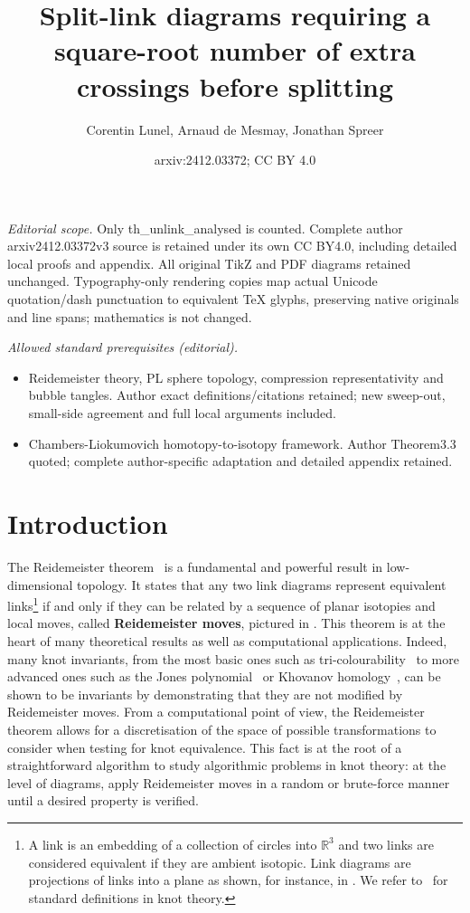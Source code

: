\documentclass[10pt,a4paper]{amsart}
\title{Split-link diagrams requiring a square-root number of extra crossings before splitting}
\author{Corentin Lunel, Arnaud de Mesmay, Jonathan Spreer}
\date{arxiv:2412.03372; CC BY 4.0}
\newcommand{\R}{\mathbb{R}}
\begin{document}
\maketitle
\noindent\textit{Editorial scope.} Only th\_unlink\_analysed is counted. Complete author arxiv2412.03372v3 source is retained under its own CC BY4.0, including detailed local proofs and appendix. All original TikZ and PDF diagrams retained unchanged. Typography-only rendering copies map actual Unicode quotation/dash punctuation to equivalent TeX glyphs, preserving native originals and line spans; mathematics is not changed.\par\medskip
\noindent\textit{Allowed standard prerequisites (editorial).}\begin{itemize}
\item Reidemeister theory, PL sphere topology, compression representativity and bubble tangles. Author exact definitions/citations retained; new sweep-out, small-side agreement and full local arguments included.
\item Chambers-Liokumovich homotopy-to-isotopy framework. Author Theorem3.3 quoted; complete author-specific adaptation and detailed appendix retained.
\end{itemize}\medskip
\section{Introduction}\label{sec_intro}

The Reidemeister theorem~\cite{Reidemeister_reidemeister_th} is a fundamental and powerful result in low-dimensional topology. It states that any two link diagrams represent equivalent links\footnote{A link is an embedding of a collection of circles into $\R^3$ and two links are considered equivalent if they are ambient isotopic. Link diagrams are projections of links into a plane as shown, for instance, in . We refer to~ for standard definitions in knot theory.} if and only if they can be related by a sequence of planar isotopies and local moves, called \textbf{Reidemeister moves}, pictured in . This theorem is at the heart of many theoretical results as well as computational applications. Indeed, many knot invariants, from the most basic ones such as tri-colourability~\cite[Section~1.5]{Adams_knotbook} to more advanced ones such as the Jones polynomial~\cite{Kauffman_Jones_poly} or Khovanov homology~\cite{bar2002khovanov}, can be shown to be invariants by demonstrating that they are not modified by Reidemeister moves. From a computational point of view, the Reidemeister theorem allows for a discretisation of the space of possible transformations to consider when testing for knot equivalence. This fact is at the root of a straightforward algorithm to study algorithmic problems in knot theory: at the level of diagrams, apply Reidemeister moves in a random or brute-force manner until a desired property is verified. 
\end{document}
